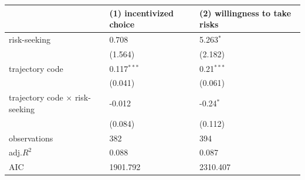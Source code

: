 \begin{tabular}{lll}
\hline
 & (1) incentivized choice & (2) willingness to take risks \\
\hline
risk-seeking & 0.708 & 5.263$^{*}$ \\
 & (1.564) & (2.182) \\
trajectory code & 0.117$^{***}$ & 0.21$^{***}$ \\
 & (0.041) & (0.061) \\
trajectory code $\times$ risk-seeking & -0.012 & -0.24$^{*}$ \\
 & (0.084) & (0.112) \\
observations & 382 & 394 \\
adj.$R^2$ & 0.088 & 0.087 \\
AIC & 1901.792 & 2310.407 \\
\hline
\end{tabular}
